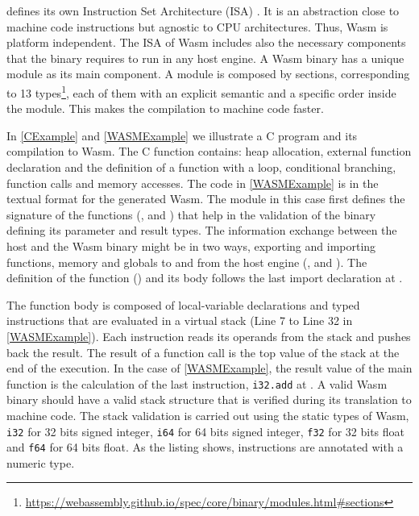 \wasm defines its own Instruction Set Architecture (ISA) \cite{wasm_spec}. It is an abstraction close to machine code instructions but agnostic to CPU architectures. Thus, Wasm  is platform independent. The ISA of Wasm  includes also the necessary components that the binary requires to run in any host engine. 
A Wasm  binary has a unique module as its main component. A module is composed by sections, corresponding to 13 types\footnote{\url{https://webassembly.github.io/spec/core/binary/modules.html\#sections}}, each of them with an explicit semantic and a specific order inside the module. This makes the compilation to machine code faster. %


In \autoref{CExample} and \autoref{WASMExample} we illustrate a C program and its compilation to Wasm. The C function contains: heap allocation, external function declaration and the definition of a function with a loop, conditional branching, function calls and memory accesses. The code in \autoref{WASMExample} is in the textual format for the generated Wasm. The module in this case first defines the signature of the functions (,   and  )  that help in the validation of the binary defining its parameter and result types. The information exchange between the host and the Wasm  binary might be in two ways, exporting and importing functions, memory and globals to and from the host engine (,  and ). The definition of the function () and its body follows the last import declaration at . 

The function body is composed of local-variable declarations and typed instructions that are evaluated in a virtual stack (Line 7 to Line 32 in \autoref{WASMExample}). Each instruction reads its operands from the stack and pushes back the result. The result of a function call is the top value of the stack at the end of the execution. In the case of \autoref{WASMExample}, the result value of the main function is the calculation of the last instruction, \texttt{i32.add} at . A valid Wasm  binary should have a valid stack structure that is verified during its translation to machine code. The stack validation is carried out using the static types of Wasm, \texttt{i32} for 32 bits signed integer, \texttt{i64} for 64 bits signed integer, \texttt{f32} for 32 bits float and \texttt{f64} for 64 bits float. As the listing shows, instructions are annotated with a numeric type.

